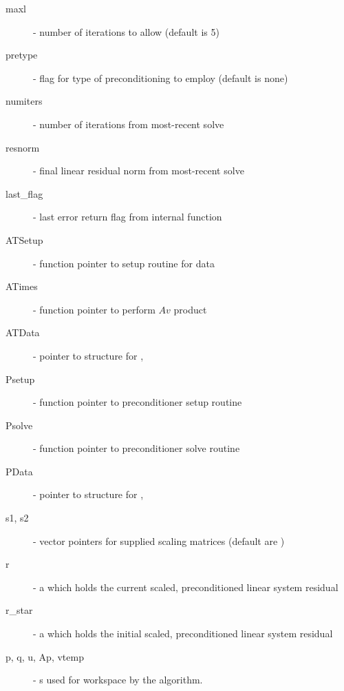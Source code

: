 \begin{description}
  \item[maxl] - number of {\spbcg} iterations to allow (default is 5)
  \item[pretype] - flag for type of preconditioning to employ
    (default is none)
  \item[numiters] - number of iterations from most-recent solve
  \item[resnorm] - final linear residual norm from most-recent solve
  \item[last\_flag] - last error return flag from internal function
  \item[ATSetup] - function pointer to setup routine for  data
  \item[ATimes] - function pointer to perform $Av$ product
  \item[ATData] - pointer to structure for , 
  \item[Psetup] - function pointer to preconditioner setup routine
  \item[Psolve] - function pointer to preconditioner solve routine
  \item[PData] - pointer to structure for , 
  \item[s1, s2] - vector pointers for supplied scaling matrices
    (default are )
  \item[r] - a {\nvector} which holds the current scaled,
    preconditioned linear system residual 
  \item[r\_star] - a {\nvector} which holds the initial scaled,
    preconditioned linear system residual 
  \item[p, q, u, Ap, vtemp] - {\nvector}s used for workspace by the
    {\spbcg} algorithm. 
\end{description}


